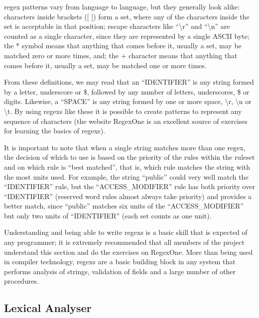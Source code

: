 \Gls{regex} patterns vary from language to language, but they generally look alike: characters inside brackets ([ ]) form a set, where any of the characters inside the set is acceptable in that position; escape characters like ``\textbackslash r'' and ``\textbackslash n'' are counted as a single character, since they are represented by a single ASCII byte; the * symbol means that anything that comes before it, usually a set, may be matched zero or more times, and; the + character means that anything that comes before it, usually a set, may be matched one or more times.

From these definitions, we may read that an ``IDENTIFIER'' is any string formed by a letter, underscore or \$, followed by any number of letters, underscores, \$ or digits. Likewise, a ``SPACE'' is any string formed by one or more space, \textbackslash r, \textbackslash n or \textbackslash t. By using \gls{regex}s like these it is possible to create patterns to represent any sequence of characters (the website RegexOne \cite{REGEXONE} is an excellent source of exercises for learning the basics of \gls{regex}s).

It is important to note that when a single string matches more than one \gls{regex}, the decision of which to use is based on the priority of the rules within the ruleset and on which rule is ``best matched'', that is, which rule matches the string with the most units used. For example, the string ``public'' could very well match the ``IDENTIFIER'' rule, but the ``ACCESS_MODIFIER'' rule has both priority over ``IDENTIFIER'' (reserved word rules almost always take priority) and  provides a better match, since ``public'' matches six units of the ``ACCESS_MODIFIER'' but only two units of ``IDENTIFIER'' (each set counts as one unit).

Understanding and being able to write \gls{regex}s is a basic skill that is expected of any programmer; it is extremely recommended that all members of the project understand this section and do the exercises on RegexOne. More than being used in compiler technology, \gls{regex}s are a basic building block in any system that performs analysis of strings, validation of fields and a large number of other procedures.


\subsection{Lexical Analyser}


